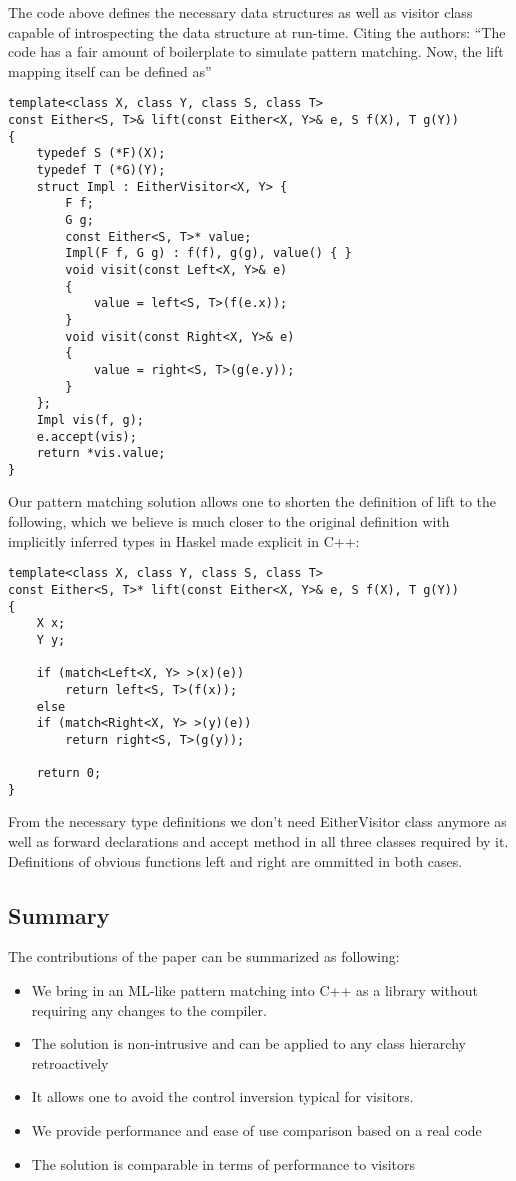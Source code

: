 \documentclass[submission,copyright]{eptcs}
\begin{document}
The code above defines the necessary data structures as well as visitor class 
capable of introspecting the data structure at run-time. Citing the authors: 
``The code has a fair amount of boilerplate to simulate pattern matching. Now, the lift mapping itself can be defined as''

\begin{lstlisting}
template<class X, class Y, class S, class T>
const Either<S, T>& lift(const Either<X, Y>& e, S f(X), T g(Y))
{
    typedef S (*F)(X);
    typedef T (*G)(Y);
    struct Impl : EitherVisitor<X, Y> {
        F f;
        G g;
        const Either<S, T>* value;
        Impl(F f, G g) : f(f), g(g), value() { }
        void visit(const Left<X, Y>& e)
        {
            value = left<S, T>(f(e.x));
        }
        void visit(const Right<X, Y>& e)
        {
            value = right<S, T>(g(e.y));
        }
    };
    Impl vis(f, g);
    e.accept(vis);
    return *vis.value;
}
\end{lstlisting}

Our pattern matching solution allows one to shorten the definition of lift to the 
following, which we believe is much closer to the original definition with 
implicitly inferred types in Haskel made explicit in C++: 

\begin{lstlisting}
template<class X, class Y, class S, class T>
const Either<S, T>* lift(const Either<X, Y>& e, S f(X), T g(Y))
{
    X x;
    Y y;
    
    if (match<Left<X, Y> >(x)(e))
        return left<S, T>(f(x));
    else
    if (match<Right<X, Y> >(y)(e))
        return right<S, T>(g(y));

    return 0;
}
\end{lstlisting}

From the necessary type definitions we don't need EitherVisitor class anymore 
as well as forward declarations and accept method in all three classes required 
by it. Definitions of obvious functions left and right are ommitted in both 
cases.

\subsection{Summary}

The contributions of the paper can be summarized as following:

\begin{itemize}
\item We bring in an ML-like pattern matching into C++ as a library without 
      requiring any changes to the compiler.
\item The solution is non-intrusive and can be applied to any class hierarchy retroactively
\item It allows one to avoid the control inversion typical for visitors.
\item We provide performance and ease of use comparison based on a real code
\item The solution is comparable in terms of performance to visitors
\end{itemize}
\end{document}
